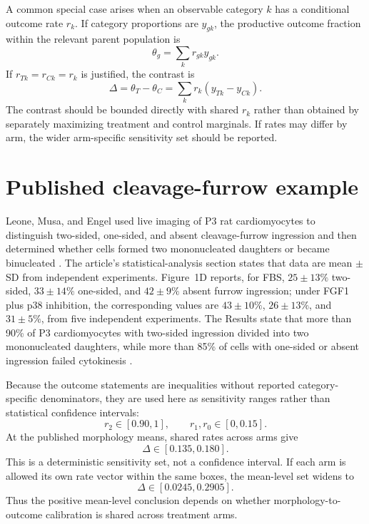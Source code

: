 \documentclass[11pt]{article}
\begin{document}
A common special case arises when an observable category $k$ has a conditional outcome rate $r_k$. If category proportions are $y_{gk}$, the productive outcome fraction within the relevant parent population is
\begin{equation}
\theta_g=\sum_kr_{gk}y_{gk}.
\end{equation}
If $r_{Tk}=r_{Ck}=r_k$ is justified, the contrast is
\begin{equation}
\Delta=\theta_T-\theta_C=\sum_kr_k(y_{Tk}-y_{Ck}).
\label{eq:contrast}
\end{equation}
The contrast should be bounded directly with shared $r_k$ rather than obtained by separately maximizing treatment and control marginals. If rates may differ by arm, the wider arm-specific sensitivity set should be reported.

\section{Published cleavage-furrow example}
Leone, Musa, and Engel used live imaging of P3 rat cardiomyocytes to distinguish two-sided, one-sided, and absent cleavage-furrow ingression and then determined whether cells formed two mononucleated daughters or became binucleated \citep{Leone2018}. The article's statistical-analysis section states that data are mean $\pm$ SD from independent experiments. Figure~1D reports, for FBS, $25\pm13\%$ two-sided, $33\pm14\%$ one-sided, and $42\pm9\%$ absent furrow ingression; under FGF1 plus p38 inhibition, the corresponding values are $43\pm10\%$, $26\pm13\%$, and $31\pm5\%$, from five independent experiments. The Results state that more than 90\% of P3 cardiomyocytes with two-sided ingression divided into two mononucleated daughters, while more than 85\% of cells with one-sided or absent ingression failed cytokinesis \citep{Leone2018}.

Because the outcome statements are inequalities without reported category-specific denominators, they are used here as sensitivity ranges rather than statistical confidence intervals:
\begin{equation}
r_{2}\in[0.90,1],\qquad r_1,r_0\in[0,0.15].
\end{equation}
At the published morphology means, shared rates across arms give
\begin{equation}
\Delta\in[0.135,0.180].
\end{equation}
This is a deterministic sensitivity set, not a confidence interval. If each arm is allowed its own rate vector within the same boxes, the mean-level set widens to
\begin{equation}
\Delta\in[0.0245,0.2905].
\end{equation}
Thus the positive mean-level conclusion depends on whether morphology-to-outcome calibration is shared across treatment arms.
\end{document}
